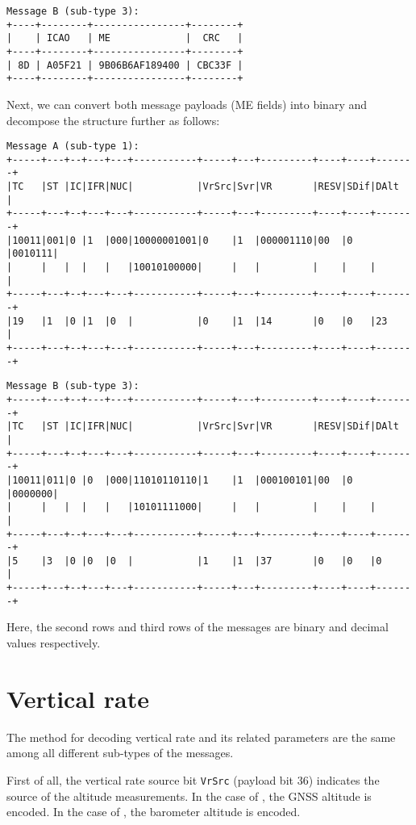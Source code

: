 \begin{verbatim}
Message B (sub-type 3):
+----+--------+----------------+--------+
|    | ICAO   | ME             |  CRC   |
+----+--------+----------------+--------+
| 8D | A05F21 | 9B06B6AF189400 | CBC33F |
+----+--------+----------------+--------+
\end{verbatim}

Next, we can convert both message payloads (ME fields) into binary and decompose the structure further as follows:

\begin{verbatim}
Message A (sub-type 1):
+-----+---+--+---+---+-----------+-----+---+---------+----+----+-------+
|TC   |ST |IC|IFR|NUC|           |VrSrc|Svr|VR       |RESV|SDif|DAlt   |
+-----+---+--+---+---+-----------+-----+---+---------+----+----+-------+
|10011|001|0 |1  |000|10000001001|0    |1  |000001110|00  |0   |0010111|
|     |   |  |   |   |10010100000|     |   |         |    |    |       |
+-----+---+--+---+---+-----------+-----+---+---------+----+----+-------+
|19   |1  |0 |1  |0  |           |0    |1  |14       |0   |0   |23     |
+-----+---+--+---+---+-----------+-----+---+---------+----+----+-------+
\end{verbatim}

\begin{verbatim}
Message B (sub-type 3):
+-----+---+--+---+---+-----------+-----+---+---------+----+----+-------+
|TC   |ST |IC|IFR|NUC|           |VrSrc|Svr|VR       |RESV|SDif|DAlt   |
+-----+---+--+---+---+-----------+-----+---+---------+----+----+-------+
|10011|011|0 |0  |000|11010110110|1    |1  |000100101|00  |0   |0000000|
|     |   |  |   |   |10101111000|     |   |         |    |    |       | 
+-----+---+--+---+---+-----------+-----+---+---------+----+----+-------+
|5    |3  |0 |0  |0  |           |1    |1  |37       |0   |0   |0      |
+-----+---+--+---+---+-----------+-----+---+---------+----+----+-------+
\end{verbatim}

Here, the second rows and third rows of the messages are binary and decimal values respectively.


\section{Vertical rate}

The method for decoding vertical rate and its related parameters are the same among all different sub-types of the messages.

First of all, the vertical rate source bit \texttt{VrSrc} (payload bit 36) indicates the source of the altitude measurements. In the case of \0, the GNSS altitude is encoded. In the case of \1, the barometer altitude is encoded.

